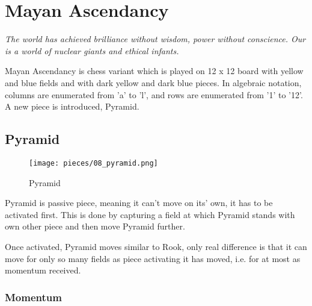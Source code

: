 

\chapter*{Mayan Ascendancy}

\begin{flushright}
\parbox{0.8\textwidth}{
\emph{The world has achieved brilliance without wisdom, power without
conscience. Our is a world of nuclear giants and ethical infants. \\
 } }
\end{flushright}

\noindent
Mayan Ascendancy is chess variant which is played on 12 x 12 board with
yellow and blue fields and with dark yellow and dark blue pieces. In
algebraic notation, columns are enumerated from 'a' to 'l', and rows are
enumerated from '1' to '12'. A new piece is introduced, Pyramid.

\clearpage %

\section*{Pyramid}

\noindent
\begin{wrapfigure}[12]{l}{0.4\textwidth}
\centering
\texttt{[image: pieces/08\_pyramid.png]}
\caption{Pyramid}
\label{fig:08_pyramid}
\end{wrapfigure}
Pyramid is passive piece, meaning it can't move on its' own, it has to be
activated first. This is done by capturing a field at which Pyramid stands
with own other piece and then move Pyramid further.

Once activated, Pyramid moves similar to Rook, only real difference is that
it can move for only so many fields as piece activating it has moved, i.e.
for at most as momentum received.

\subsection*{Momentum}

